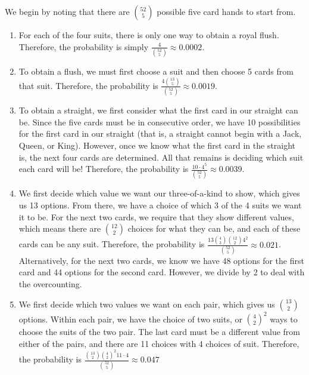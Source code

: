 \documentclass[11pt]{article}
\begin{document}
\begin{solution}{5}
We begin by noting that there are $\binom{52}{5}$ possible five card hands to start from. 
    \begin{enumerate}
        \item For each of the four suits, there is only one way to obtain a royal flush. Therefore,
        the probability is simply $\frac{4}{{52 \choose 5}} \approx 0.0002$.
        \item To obtain a flush, we must first choose a suit and then choose 5 cards from
        that suit. Therefore, the probability is $\frac{4 {13 \choose 5}}{{52 \choose 5}} \approx
        0.0019$.
        \item To obtain a straight, we first consider what the first card in our straight can be. 
        Since the five cards must be in consecutive order, we have 10 possibilities for the first
        card in our straight (that is, a straight cannot begin with a Jack, Queen, or King). However,
        once we know what the first card in the straight is, the next four cards are determined. All
        that remains is deciding which suit each card will be! Therefore, the probability is
        $\frac{10 \cdot 4^5}{{52 \choose 5}} \approx 0.0039$.
        \item We first decide which value we want our three-of-a-kind to show, which gives us 13 options.
        From there, we have a choice of which 3 of the 4 suits we want it to be. For the next two cards, 
        we require that they show different values, which means there are ${12 \choose 2}$ choices 
        for what they can be, and each of these cards can be any suit. Therefore, the probability is 
        $\frac{13{4\choose 3}{12 \choose 2}4^2}{{52\choose 5}} \approx 0.021$.\\
        
        Alternatively, for the next two cards, we know we have 48 options for the first card and 44
        options for the second card. However, we divide by 2 to deal with the overcounting. 
        \item We first decide which two values we want on each pair, which gives us ${13 \choose 2}$ options. Within each pair, we have the choice of two suits, or ${4 \choose 2}^2$ ways to choose
        the suits of the two pair. The last card must be a different value from either of the pairs, 
        and there are 11 choices with 4 choices of suit. Therefore, the probability is 
        $\frac{{13\choose 2}{4\choose 2}^2 11 \cdot 4}{{52 \choose 5}} \approx 0.047$
    \end{enumerate}
\end{solution}
\end{document}
